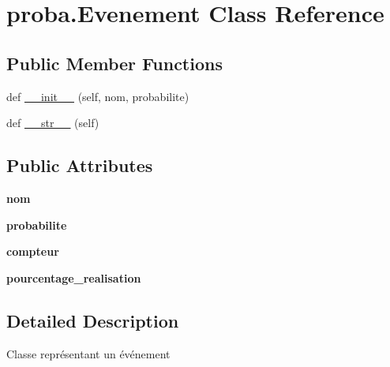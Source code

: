 \hypertarget{classproba_1_1Evenement}{}\section{proba.\+Evenement Class Reference}
\label{classproba_1_1Evenement}
\subsection*{Public Member Functions}
\begin{DoxyCompactItemize}
\item 
def \hyperlink{classproba_1_1Evenement_adf26b397f3c7dd7da2ef776afa2f4ad0}{\+\_\+\+\_\+init\+\_\+\+\_\+} (self, nom, probabilite)
\item 
def \hyperlink{classproba_1_1Evenement_af050127b429bf802657b168c83ce1178}{\+\_\+\+\_\+str\+\_\+\+\_\+} (self)
\end{DoxyCompactItemize}
\subsection*{Public Attributes}
\begin{DoxyCompactItemize}
\item 
{\bfseries nom}\hypertarget{classproba_1_1Evenement_a648c2517265de40ac3b2cbc103685134}{}\label{classproba_1_1Evenement_a648c2517265de40ac3b2cbc103685134}

\item 
{\bfseries probabilite}\hypertarget{classproba_1_1Evenement_aeac5d19d59ada3a61b70cf4ba7430263}{}\label{classproba_1_1Evenement_aeac5d19d59ada3a61b70cf4ba7430263}

\item 
{\bfseries compteur}\hypertarget{classproba_1_1Evenement_aa6d786e9adbe88999bd16142af924c6a}{}\label{classproba_1_1Evenement_aa6d786e9adbe88999bd16142af924c6a}

\item 
{\bfseries pourcentage\+\_\+realisation}\hypertarget{classproba_1_1Evenement_a3c8adfbb106d9e80eb892b481382bc09}{}\label{classproba_1_1Evenement_a3c8adfbb106d9e80eb892b481382bc09}

\end{DoxyCompactItemize}


\subsection{Detailed Description}
\begin{DoxyVerb}    Classe représentant un événement
\end{DoxyVerb}
 

